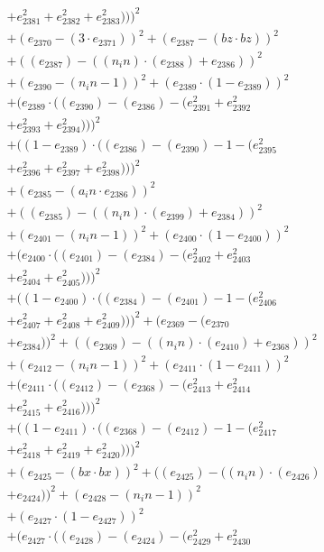\documentclass[10pt, a4paper]{article}
\begin{document}
\begin{align*}
& + e_{2381}^{2} + e_{2382}^{2} + e_{2383}^{2})))^{2} \\
& + (e_{2370} - (3  \cdot  e_{2371}))^{2} + (e_{2387} - (bz  \cdot  bz))^{2} \\
& + ((e_{2387}) - ((n_in)  \cdot  (e_{2388}) + e_{2386}))^{2} \\
& + (e_{2390} - (n_in - 1))^{2} + (e_{2389}  \cdot  (1 - e_{2389}))^{2} \\
& + (e_{2389}  \cdot  ((e_{2390}) - (e_{2386}) - (e_{2391}^{2} + e_{2392}^{2} \\
& + e_{2393}^{2} + e_{2394}^{2})))^{2} \\
& + ((1 - e_{2389})  \cdot  ((e_{2386}) - (e_{2390}) - 1 - (e_{2395}^{2} \\
& + e_{2396}^{2} + e_{2397}^{2} + e_{2398}^{2})))^{2} \\
& + (e_{2385} - (a_in  \cdot  e_{2386}))^{2} \\
& + ((e_{2385}) - ((n_in)  \cdot  (e_{2399}) + e_{2384}))^{2} \\
& + (e_{2401} - (n_in - 1))^{2} + (e_{2400}  \cdot  (1 - e_{2400}))^{2} \\
& + (e_{2400}  \cdot  ((e_{2401}) - (e_{2384}) - (e_{2402}^{2} + e_{2403}^{2} \\
& + e_{2404}^{2} + e_{2405}^{2})))^{2} \\
& + ((1 - e_{2400})  \cdot  ((e_{2384}) - (e_{2401}) - 1 - (e_{2406}^{2} \\
& + e_{2407}^{2} + e_{2408}^{2} + e_{2409}^{2})))^{2} + (e_{2369} - (e_{2370} \\
& + e_{2384}))^{2} + ((e_{2369}) - ((n_in)  \cdot  (e_{2410}) + e_{2368}))^{2} \\
& + (e_{2412} - (n_in - 1))^{2} + (e_{2411}  \cdot  (1 - e_{2411}))^{2} \\
& + (e_{2411}  \cdot  ((e_{2412}) - (e_{2368}) - (e_{2413}^{2} + e_{2414}^{2} \\
& + e_{2415}^{2} + e_{2416}^{2})))^{2} \\
& + ((1 - e_{2411})  \cdot  ((e_{2368}) - (e_{2412}) - 1 - (e_{2417}^{2} \\
& + e_{2418}^{2} + e_{2419}^{2} + e_{2420}^{2})))^{2} \\
& + (e_{2425} - (bx  \cdot  bx))^{2} + ((e_{2425}) - ((n_in)  \cdot  (e_{2426}) \\
& + e_{2424}))^{2} + (e_{2428} - (n_in - 1))^{2} \\
& + (e_{2427}  \cdot  (1 - e_{2427}))^{2} \\
& + (e_{2427}  \cdot  ((e_{2428}) - (e_{2424}) - (e_{2429}^{2} + e_{2430}^{2} \\

\end{align*}
\end{document}
